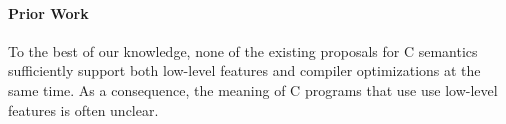 












\paragraph{Prior Work}

To the best of our knowledge, none of the existing proposals for C semantics sufficiently support
both low-level features and compiler optimizations at the same time.  As a consequence, the meaning
of C programs that use use low-level features is often unclear.

